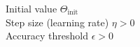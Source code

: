 \documentclass[preview]{standalone}
\begin{document}
Initial value $\Theta_{\text{init}}$\\Step size (learning rate) $\eta > 0$\\Accuracy threshold $\epsilon > 0$\\
\end{document}
